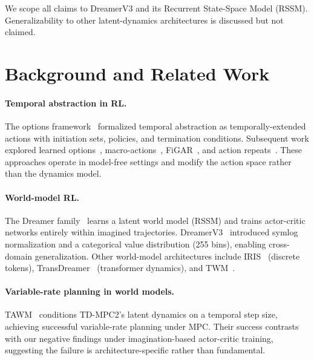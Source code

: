 \documentclass[10pt,letterpaper]{article}
\begin{document}
We scope all claims to DreamerV3 and its Recurrent State-Space Model (RSSM). Generalizability to other latent-dynamics architectures is discussed but not claimed.

\section{Background and Related Work}
\label{sec:background}

\paragraph{Temporal abstraction in RL.}
The options framework~\citep{sutton1999between} formalized temporal abstraction as temporally-extended actions with initiation sets, policies, and termination conditions. Subsequent work explored learned options~\citep{bacon2017option}, macro-actions~\citep{durugkar2016deep}, FiGAR~\citep{sharma2017learning}, and action repeats~\citep{lakshminarayanan2017dynamic}. These approaches operate in model-free settings and modify the action space rather than the dynamics model.

\paragraph{World-model RL.}
The Dreamer family~\citep{hafner2019dream,hafner2020mastering,hafner2023mastering} learns a latent world model (RSSM) and trains actor-critic networks entirely within imagined trajectories. DreamerV3~\citep{hafner2023mastering} introduced symlog normalization and a categorical value distribution (255 bins), enabling cross-domain generalization. Other world-model architectures include IRIS~\citep{micheli2022transformers} (discrete tokens), TransDreamer~\citep{chen2022transdreamer} (transformer dynamics), and TWM~\citep{robine2023transformer}.

\paragraph{Variable-rate planning in world models.}
TAWM~\citep{nhu2025tawm} conditions TD-MPC2's latent dynamics on a temporal step size, achieving successful variable-rate planning under MPC. Their success contrasts with our negative findings under imagination-based actor-critic training, suggesting the failure is architecture-specific rather than fundamental.
\end{document}
